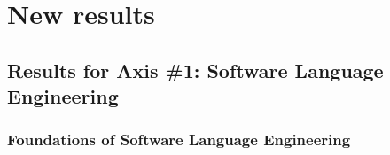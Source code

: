 








\section{New results}
\label{diverse:results}



\subsection{Results for Axis \#1: Software Language Engineering}
\label{resultats:results-axis1}


\begin{participants}
\end{participants}

\subsubsection{Foundations of Software Language Engineering}

